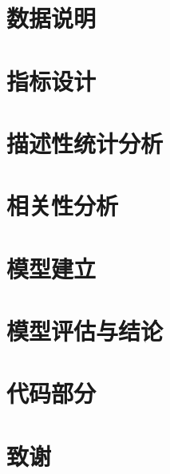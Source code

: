 \documentclass{report}
\begin{document}
	\section{数据说明}
	
	
	\section{指标设计}
	
	
	\section{描述性统计分析}
	
	
	\section{相关性分析}
	
	
	\section{模型建立}
	
	
	\section{模型评估与结论}
	
	
	

	
	
	
	\section{代码部分}
	


    
	\section{致谢}
	
	
	
	
	
	
	
	
	
	
	
\end{document}
